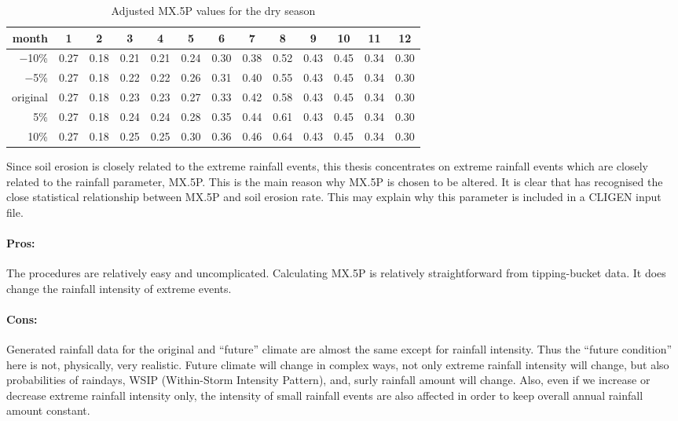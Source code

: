 \begin{table}[htbp]
  \centering
  \footnotesize
  \caption{Adjusted {MX.5P} values for the dry season}
  \label{tab:AdjustedMX5Pvaluesfordryseasons}
    \begin{tabular}{r|cc|cccccc|cccc}
      \toprule
      month & 1 &2& \textbf{3} &\textbf{4} &\textbf{5}& \textbf{6}& \textbf{7}&
\textbf{8}& 9 &10& 11& 12\\
      \midrule
      $-$10\%  &0.27&  0.18  &0.21 & 0.21 & 0.24 & 0.30 & 0.38 & 0.52 & 0.43 &
0.45 & 0.34&  0.30\\
      $-$5\% & 0.27 & 0.18 & 0.22  &0.22  &0.26  &0.31 & 0.40& 0.55 & 0.43 &
0.45 & 0.34 & 0.30\\
      original&  0.27  &0.18 & 0.23  &0.23 & 0.27 & 0.33 &0.42  &0.58 & 0.43&
0.45 & 0.34 & 0.30\\
      5\%  &0.27 & 0.18&  0.24& 0.24 & 0.28 & 0.35 & 0.44 &0.61 & 0.43 & 0.45 &
0.34 & 0.30\\
      10\% & 0.27  &0.18 & 0.25  &0.25  &0.30  &0.36 & 0.46& 0.64 & 0.43 &0.45
&0.34  &0.30 \\
      \bottomrule
    \end{tabular}
\end{table}

Since soil erosion is closely related to the extreme rainfall events, this
thesis concentrates on extreme rainfall events which are closely related to the
rainfall parameter, {MX.5P}. This is the main reason why {MX.5P} is chosen to be
altered. It is clear that \citet{nicks1995-2} has recognised the close
statistical relationship between {MX.5P} and soil erosion rate. This may explain
why this parameter is included in a CLIGEN input file.

\paragraph{Pros:}
\label{sec:ProsMethodTwo}
The procedures are relatively easy and uncomplicated. Calculating {MX.5P} is
relatively straightforward from tipping-bucket data. It does change the rainfall
intensity of extreme events.

\paragraph{Cons:}
\label{sec:ConsMethodTwo}
Generated rainfall data for the original and ``future'' climate are almost the
same except for rainfall intensity. Thus the ``future condition'' here is not,
physically, very realistic. Future climate will change in complex ways, not
only extreme rainfall intensity will change, but also probabilities of raindays,
WSIP (Within-Storm Intensity Pattern), and, surly rainfall amount will change.
Also, even if we increase or decrease extreme rainfall intensity only, the
intensity of small rainfall events are also affected in order to keep overall
annual rainfall amount constant.

